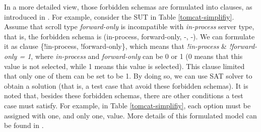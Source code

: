 \documentclass[10pt,journal,compsoc]{IEEEtran}
\begin{document}
In a more detailed view, those forbidden schemas are formulated into clauses, as introduced in \cite{cohen2008constructing}. For example, consider the SUT in Table \ref{tomcat-simplifiy}. Assume that scroll type \emph{forward-only} is incompatible with \emph{in-process} server type, that is, the forbidden schema is (in-process, forward-only, -, -). We can formulate it as clause \{!in-process, !forward-only\}, which means that \emph{ !in-process} \&  \emph{!forward-only = 1}, where \emph{in-process} and \emph{forward-only} can be 0 or 1 (0 means that this value is not selected, while 1 means this value is selected). This clause limited that only one of them can be set to be 1.  By doing so, we can use SAT solver \cite{Berkelaar2004} to obtain a solution (that is, a test case that avoid these forbidden schemas). It is noted that, besides these forbidden schemas, there are other conditions a test case must satisfy. For example, in Table \ref{tomcat-simplifiy}, each option must be assigned with one, and only one, value. More details of this formulated model can be found in \cite{cohen2008constructing,cohen2007exploiting}.

%






\end{document}
